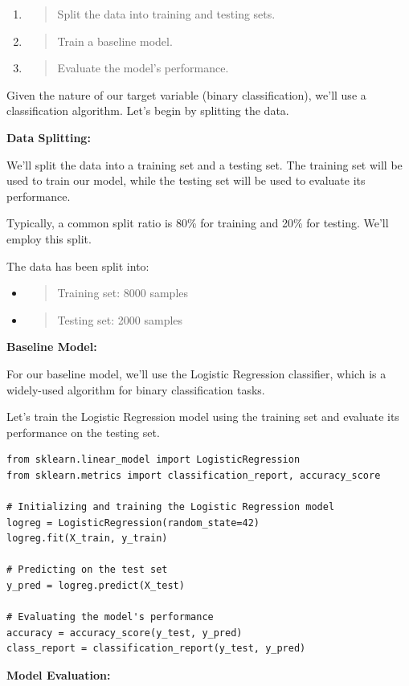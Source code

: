 \documentclass[]{article}
\begin{document}
\begin{enumerate}
\def\labelenumi{\arabic{enumi}.}
\item
  \begin{quote}
  Split the data into training and testing sets.
  \end{quote}
\item
  \begin{quote}
  Train a baseline model.
  \end{quote}
\item
  \begin{quote}
  Evaluate the model's performance.
  \end{quote}
\end{enumerate}

Given the nature of our target variable (binary classification), we'll
use a classification algorithm. Let's begin by splitting the data.

\textbf{Data Splitting:}

We'll split the data into a training set and a testing set. The training
set will be used to train our model, while the testing set will be used
to evaluate its performance.

Typically, a common split ratio is 80\% for training and 20\% for
testing. We'll employ this split.

The data has been split into:

\begin{itemize}
\item
  \begin{quote}
  Training set: 8000 samples
  \end{quote}
\item
  \begin{quote}
  Testing set: 2000 samples
  \end{quote}
\end{itemize}

\textbf{Baseline Model:}

For our baseline model, we'll use the Logistic Regression classifier,
which is a widely-used algorithm for binary classification tasks.

Let's train the Logistic Regression model using the training set and
evaluate its performance on the testing set.
\begin{verbatim}
from sklearn.linear_model import LogisticRegression
from sklearn.metrics import classification_report, accuracy_score

# Initializing and training the Logistic Regression model
logreg = LogisticRegression(random_state=42)
logreg.fit(X_train, y_train)

# Predicting on the test set
y_pred = logreg.predict(X_test)

# Evaluating the model's performance
accuracy = accuracy_score(y_test, y_pred)
class_report = classification_report(y_test, y_pred)
\end{verbatim}
\textbf{Model Evaluation:}
\end{document}
